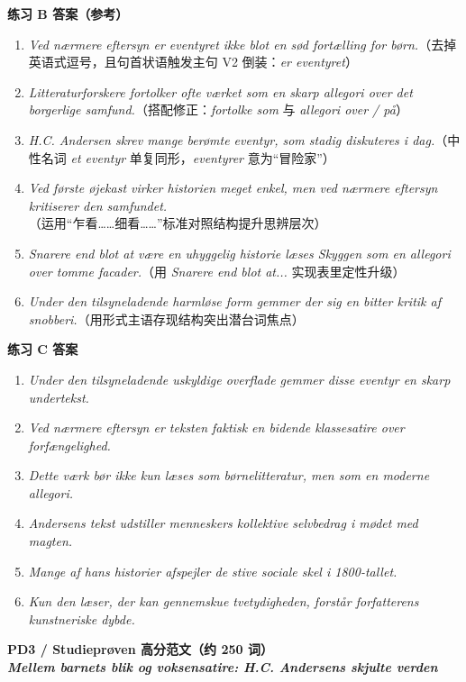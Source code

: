 \begin{answerbox}
\textbf{练习 B 答案（参考）}
\begin{enumerate}
  \item \textit{Ved nærmere eftersyn er eventyret ikke blot en sød fortælling for børn.}（去掉英语式逗号，且句首状语触发主句 V2 倒装：\textit{er eventyret}）
  \item \textit{Litteraturforskere fortolker ofte værket som en skarp allegori over det borgerlige samfund.}（搭配修正：\textit{fortolke som} 与 \textit{allegori over / på}）
  \item \textit{H.C. Andersen skrev mange berømte eventyr, som stadig diskuteres i dag.}（中性名词 \textit{et eventyr} 单复同形，\textit{eventyrer} 意为“冒险家”）
  \item \textit{Ved første øjekast virker historien meget enkel, men ved nærmere eftersyn kritiserer den samfundet.}（运用“乍看……细看……”标准对照结构提升思辨层次）
  \item \textit{Snarere end blot at være en uhyggelig historie læses Skyggen som en allegori over tomme facader.}（用 \textit{Snarere end blot at...} 实现表里定性升级）
  \item \textit{Under den tilsyneladende harmløse form gemmer der sig en bitter kritik af snobberi.}（用形式主语存现结构突出潜台词焦点）
\end{enumerate}

\textbf{练习 C 答案}
\begin{enumerate}
  \item \textit{Under den tilsyneladende uskyldige overflade gemmer disse eventyr en skarp undertekst.}
  \item \textit{Ved nærmere eftersyn er teksten faktisk en bidende klassesatire over forfængelighed.}
  \item \textit{Dette værk bør ikke kun læses som børnelitteratur, men som en moderne allegori.}
  \item \textit{Andersens tekst udstiller menneskers kollektive selvbedrag i mødet med magten.}
  \item \textit{Mange af hans historier afspejler de stive sociale skel i 1800-tallet.}
  \item \textit{Kun den læser, der kan gennemskue tvetydigheden, forstår forfatterens kunstneriske dybde.}
\end{enumerate}

\textbf{PD3 / Studieprøven 高分范文（约 250 词）}\\
\textit{\textbf{Mellem barnets blik og voksensatire: H.C. Andersens skjulte verden}}


\end{answerbox}

